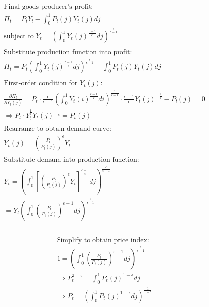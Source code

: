 \documentclass[11pt,preprint]{elsarticle}
\numberwithin{equation}{section}
\numberwithin{figure}{section}
\numberwithin{table}{section}
\begin{document}
\begin{align*}  
& \text{Final goods producer's profit:} \\  
& \Pi_t = P_t Y_t - \int_0^1 P_t(j) Y_t(j)  dj \\  
& \text{subject to } Y_t = \left( \int_0^1 Y_t(j)^{\frac{\epsilon-1}{\epsilon}}  dj \right)^{\frac{\epsilon}{\epsilon-1}} \\  
& \\  
& \text{Substitute production function into profit:} \\  
& \Pi_t = P_t \left( \int_0^1 Y_t(j)^{\frac{\epsilon-1}{\epsilon}}  dj \right)^{\frac{\epsilon}{\epsilon-1}} - \int_0^1 P_t(j) Y_t(j)  dj \\  
& \\  
& \text{First-order condition for } Y_t(j): \\  
& \frac{\partial \Pi_t}{\partial Y_t(j)} = P_t \cdot \frac{\epsilon}{\epsilon-1} \left( \int_0^1 Y_t(i)^{\frac{\epsilon-1}{\epsilon}}  di \right)^{\frac{1}{\epsilon-1}} \cdot \frac{\epsilon-1}{\epsilon} Y_t(j)^{-\frac{1}{\epsilon}} - P_t(j) = 0 \\  
& \Rightarrow P_t \cdot Y_t^{\frac{1}{\epsilon}} Y_t(j)^{-\frac{1}{\epsilon}} = P_t(j) \\  
& \\  
& \text{Rearrange to obtain demand curve:} \\  
& Y_t(j) = \left( \frac{P_t}{P_t(j)} \right)^{\epsilon} Y_t \\  
& \\  
& \text{Substitute demand into production function:} \\  
& Y_t = \left( \int_0^1 \left[ \left( \frac{P_t}{P_t(j)} \right)^{\epsilon} Y_t \right]^{\frac{\epsilon-1}{\epsilon}}  dj \right)^{\frac{\epsilon}{\epsilon-1}} \\  
& = Y_t \left( \int_0^1 \left( \frac{P_t}{P_t(j)} \right)^{\epsilon-1}  dj \right)^{\frac{\epsilon}{\epsilon-1}} \\  
& \\
\end{align*}

\begin{align*} 
& \text{Simplify to obtain price index:} \\  
& 1 = \left( \int_0^1 \left( \frac{P_t}{P_t(j)} \right)^{\epsilon-1}  dj \right)^{\frac{\epsilon}{\epsilon-1}} \\  
& \Rightarrow P_t^{1-\epsilon} = \int_0^1 P_t(j)^{1-\epsilon}  dj \\  
& \Rightarrow P_t = \left( \int_0^1 P_t(j)^{1-\epsilon}  dj \right)^{\frac{1}{1-\epsilon}}  
\end{align*}
\end{document}

